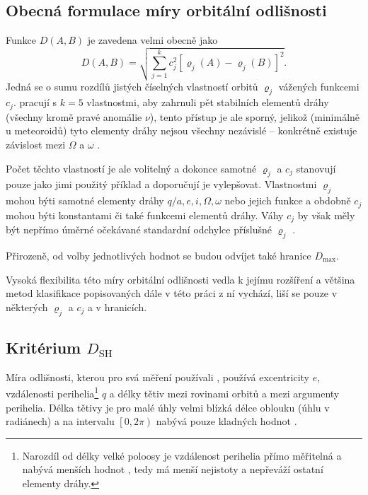 \subsection{Obecná formulace míry orbitální odlišnosti}%
Funkce $D(A,B)$ je zavedena velmi obecně jako \cite{dsh}
\begin{equation}
    D(A,B)=\sqrt{
    \sum_{j=1}^{k}{c_j^2\left[ \varrho_j(A)-\varrho_j(B) \right]^2}
    }\text{.}
\end{equation}
Jedná se o sumu rozdílů jistých číselných vlastností orbitů $\varrho_j$ vážených funkcemi $c_j$. \citeauthor{dsh} pracují s $k=5$ vlastnostmi, aby zahrnuli pět stabilních elementů dráhy (všechny kromě pravé anomálie $\nu$), tento přístup je ale sporný, jelikož (minimálně u meteoroidů) tyto elementy dráhy nejsou všechny nezávislé -- konkrétně existuje závislost mezi $\Omega$ a $\omega$ \cite{remarks}.

Počet těchto vlastností je ale volitelný a dokonce samotné $\varrho_j$ a $c_j$ \citeauthor{dsh} stanovují pouze jako jimi použitý příklad a doporučují je vylepšovat. Vlastnostmi $\varrho_j$ mohou býti samotné elementy dráhy $q/a,e,i,\Omega,\omega$ nebo jejich funkce a obdobně $c_j$ mohou býti konstantami či také funkcemi elementů dráhy. Váhy $c_j$ by však měly být nepřímo úměrné očekávané standardní odchylce příslušné $\varrho_j$ \cite{dsh}.

Přirozeně, od volby jednotlivých hodnot se budou odvíjet také hranice $D_\text{max}$.

\smallskip

Vysoká flexibilita této míry orbitální odlišnosti vedla k jejímu rozšíření a většina metod klasifikace popisovaných dále v této práci z ní vychází, liší se pouze v některých $\varrho_j$ a $c_j$ a v hranicích.

\subsection{Kritérium $D_\text{SH}$}%
Míra odlišnosti, kterou pro svá měření používali \citeauthor{dsh}, používá excentricity $e$, vzdálenosti perihelia\footnote{Narozdíl od délky velké poloosy je vzdálenost perihelia přímo měřitelná a nabývá menších hodnot \cite{dsh}, tedy má menší nejistoty a nepřeváží ostatní elementy dráhy.} $q$ a délky tětiv mezi rovinami orbitů a mezi argumenty perihelia. Délka tětivy je pro malé úhly velmi blízká délce oblouku (úhlu v radiánech) a na intervalu $\left[0,2\pi\right)$ nabývá pouze kladných hodnot \cite{dsh}.

